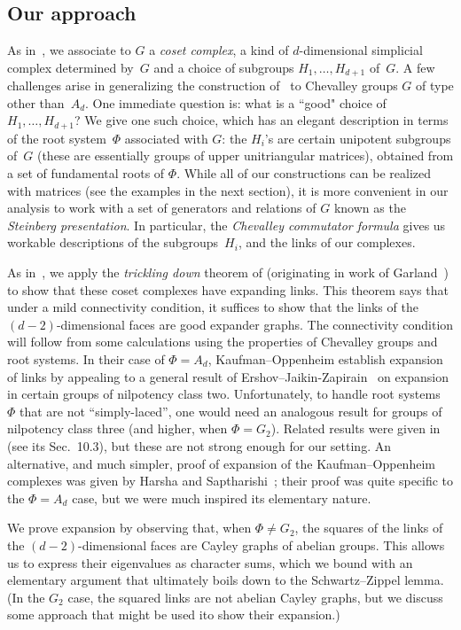 \documentclass[11pt]{article}
\begin{document}
\subsection{Our approach}
As in~\cite{KO18}, we associate to $G$ a \emph{coset complex}, a kind of $d$-dimensional simplicial complex determined by~$G$ and a choice of subgroups $H_1, \ldots, H_{d+1}$ of~$G$.
A few challenges arise in generalizing the construction of~\cite{KO18} to Chevalley groups $G$ of type other than~$A_d$.
One immediate question is: what is a ``good" choice of $H_1, \ldots, H_{d+1}$?
We give one such choice, which has an elegant description in terms of the root system~$\Phi$ associated with $G$: the $H_i$'s are certain unipotent subgroups of~$G$ (these are essentially groups of upper unitriangular matrices), obtained from a set of fundamental roots of $\Phi$. While all of our constructions can be realized with matrices (see the examples in the next section), it is more convenient in our analysis to work with a set of generators and relations of $G$ known as the \emph{Steinberg presentation}. In particular, the \emph{Chevalley commutator formula} gives us workable descriptions of the subgroups~$H_i$, and the links of our complexes.

As in~\cite{KO18}, we apply the \emph{trickling down} theorem of \cite{Opp18} (originating in work of Garland~\cite{Gar73}) to show that these coset complexes have expanding links.
This theorem says that under a mild connectivity condition, it suffices to show that the links of the $(d-2)$-dimensional faces are good expander graphs.
The connectivity condition will follow from some calculations using the properties of Chevalley groups and root systems. In their case of $\Phi = A_d$, Kaufman--Oppenheim establish expansion of links by appealing to a general result of Ershov--Jaikin-Zapirain~\cite{EJ10} on expansion in certain groups of nilpotency class two.
Unfortunately, to handle root systems~$\Phi$ that are not ``simply-laced'', one would need an analogous result for groups of nilpotency class three (and higher, when $\Phi = G_2$).
Related results were given in \cite{EJK17} (see its Sec.~10.3), but these are not strong enough for our setting.
An alternative, and much simpler, proof of expansion of the Kaufman--Oppenheim complexes was given by Harsha and Saptharishi~\cite{HS19}; their proof was quite specific to the $\Phi = A_d$ case, but we were much inspired its elementary nature.

We prove expansion by observing that, when $\Phi \neq G_2$, the squares of the links of the $(d-2)$-dimensional faces are Cayley graphs of abelian groups. This allows us to express their eigenvalues as character sums, which we bound with an elementary argument that ultimately boils down to the Schwartz--Zippel lemma.  (In the $G_2$ case, the squared links are not abelian Cayley graphs, but we discuss some approach that might be used ito show their expansion.)
\end{document}
